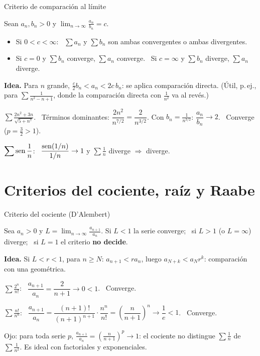 \documentclass[10pt,aspectratio=169]{beamer}
\begin{document}
\begin{frame}{Criterio de comparación al límite}
  \begin{teorema}
    Sean $a_n,b_n>0$ y $\displaystyle\lim_{n\to\infty}\frac{a_n}{b_n}=c$.
    \begin{itemize}
      \item Si $0<c<\infty$: \ $\sum a_n$ y $\sum b_n$ son ambas convergentes o ambas divergentes.
      \item Si $c=0$ y $\sum b_n$ converge, $\sum a_n$ converge. \ Si $c=\infty$ y $\sum b_n$ diverge, $\sum a_n$ diverge.
    \end{itemize}
  \end{teorema}
  \textbf{Idea.} Para $n$ grande, $\frac c2b_n<a_n<2c\,b_n$: se aplica comparación directa. (Útil, p.\,ej., para
  $\sum\frac1{n^2-n+1}$, donde la comparación directa con $\frac1{n^2}$ va al revés.)
  \begin{ejemplo}[4]
    $\displaystyle\sum\frac{2n^2+3n}{\sqrt{5+n^7}}$. \ Términos dominantes: $\dfrac{2n^2}{n^{7/2}}=\dfrac{2}{n^{3/2}}$. Con $b_n=\frac1{n^{3/2}}$:
    $\dfrac{a_n}{b_n}\to2$. \ Converge ($p=\frac32>1$).
  \end{ejemplo}
  \begin{ejemplo}[5]
    $\displaystyle\sum\operatorname{sen}\frac1n$: \ $\dfrac{\operatorname{sen}(1/n)}{1/n}\to1$ y $\sum\frac1n$ diverge $\Rightarrow$ diverge.
  \end{ejemplo}
\end{frame}

\section{Criterios del cociente, raíz y Raabe}

\begin{frame}{Criterio del cociente (D'Alembert)}
  \begin{teorema}
    Sea $a_n>0$ y $\displaystyle L=\lim_{n\to\infty}\frac{a_{n+1}}{a_n}$.
    \quad Si $L<1$ la serie converge; \ si $L>1$ (o $L=\infty$) diverge; \ si $L=1$ el criterio \textbf{no decide}.
  \end{teorema}
  \textbf{Idea.} Si $L<r<1$, para $n\ge N$: $a_{n+1}<ra_n$, luego $a_{N+k}<a_Nr^k$: comparación con una geométrica.
  \begin{ejemplo}[6]
    $\displaystyle\sum\frac{2^n}{n!}$: \ $\dfrac{a_{n+1}}{a_n}=\dfrac{2}{n+1}\to0<1$. \ Converge.
  \end{ejemplo}
  \begin{ejemplo}[7]
    $\displaystyle\sum\frac{n!}{n^n}$: \ $\dfrac{a_{n+1}}{a_n}=\dfrac{(n+1)!}{(n+1)^{n+1}}\cdot\dfrac{n^n}{n!}=\left(\dfrac{n}{n+1}\right)^n\to\dfrac1e<1$. \ Converge.
  \end{ejemplo}
  \small \alert{Ojo:} para toda serie $p$, $\frac{a_{n+1}}{a_n}=\left(\frac{n}{n+1}\right)^p\to1$: el cociente no distingue
  $\sum\frac1n$ de $\sum\frac1{n^2}$. Es ideal con factoriales y exponenciales.
\end{frame}
\end{document}
